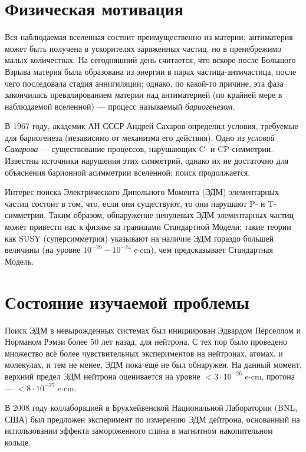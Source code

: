 \documentclass{article}
\begin{document}
	\singlespacing
	
	
	\tableofcontents 
	\pagebreak
	
	\onehalfspacing
	
	\section*{Физическая мотивация}
	 Вся наблюдаемая вселенная состоит преимущественно из материи; антиматерия может быть получена в ускорителях заряженных частиц, но в пренебрежимо малых количествах. На сегодняшний день считается, что вскоре после Большого Взрыва материя была образована из энергии в парах частица-античастица, после чего последовала стадия аннигиляции; однако, по какой-то причине, эта фаза закончилась превалированием материи над антиматерией (по крайней мере в наблюдаемой вселенной) --- процесс называемый \emph{бариогенезом.}
	
	В 1967 году, академик АН СССР Андрей Сахаров определил условия, требуемые для бариогенеза (независимо от механизма его действия). Одно из \emph{условий Сахарова} --- существование процессов, нарушающих C- и CP-симметрии. Известны источники нарушения этих симметрий, однако их не достаточно для объяснения барионной асимметрии вселенной; поиск продолжается.
	
	Интерес поиска Электрического Дипольного Момента (ЭДМ) элементарных частиц состоит в том, что, если они существуют, то они нарушают P- и T-симметрии. Таким образом, обнаружение ненулевых ЭДМ элементарных частиц может привести нас к физике за границами Стандартной Модели; такие теории как SUSY (суперсимметрия) указывают на наличие ЭДМ гораздо большей величины (на уровне $10^{-29} - 10^{-24}$ e$\cdot$cm), чем предсказывает Стандартная Модель.
		
	\section{Состояние изучаемой проблемы}
	Поиск ЭДМ в невырожденных системах был инициирован Эдвардом Пёрселлом и Норманом Рэмзи более 50 лет назад, для нейтрона. С тех пор было проведено множество всё более чувствительных экспериментов на нейтронах, атомах, и молекулах, и тем не менее, ЭДМ пока ещё не был обнаружен. На данный момент, верхний предел ЭДМ нейтрона оценивается на уровне $<3\cdot 10^{-26}$ e$\cdot$cm, протона --- $<8\cdot 10^{-25}$ e$\cdot$cm.~\cite{Pretz_presentation}
	
	В 2008 году коллаборацией в Брукхейвенской Национальной Лаборатории (BNL, США) был предложен эксперимент по измерению ЭДМ дейтрона, основанный на использовании эффекта замороженного спина в магнитном накопительном кольце.~\cite{BNL} 
	
\end{document}
